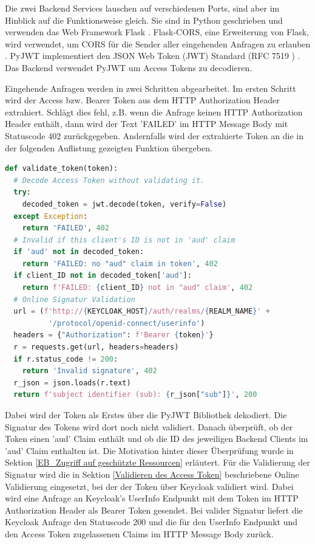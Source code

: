 Die zwei Backend Services lauschen auf verschiedenen Ports, sind aber im Hinblick auf die Funktionsweise gleich. Sie sind in Python geschrieben und verwenden das Web Framework Flask \cite{EB48}. Flask-CORS, eine Erweiterung von Flask, wird verwendet, um CORS für die Sender aller eingehenden Anfragen zu erlauben \cite{EB49}. PyJWT implementiert den JSON Web Token (JWT) Standard (RFC 7519 \cite{EB50}) \cite{EB51}. Das Backend verwendet PyJWT um Access Tokens zu decodieren.

Eingehende Anfragen werden in zwei Schritten abgearbeitet. Im ersten Schritt wird der Access bzw. Bearer Token aus dem HTTP Authorization Header extrahiert. Schlägt dies fehl, z.B. wenn die Anfrage keinen HTTP Authorization Header enthält, dann wird der Text 'FAILED' im HTTP Message Body mit Statuscode 402 zurückgegeben. Andernfalls wird der extrahierte Token an die in der folgenden Auflistung gezeigten Funktion übergeben.

\begin{lstlisting}[caption=Token Validierung im Backend, captionpos=b, language=python]
def validate_token(token):
  # Decode Access Token without validating it.
  try:
    decoded_token = jwt.decode(token, verify=False)
  except Exception:
    return 'FAILED', 402
  # Invalid if this client's ID is not in 'aud' claim
  if 'aud' not in decoded_token:
    return 'FAILED: no "aud" claim in token', 402
  if client_ID not in decoded_token['aud']:
    return f'FAILED: {client_ID} not in "aud" claim', 402
  # Online Signatur Validation
  url = (f'http://{KEYCLOAK_HOST}/auth/realms/{REALM_NAME}' +
          '/protocol/openid-connect/userinfo')
  headers = {"Authorization": f'Bearer {token}'}
  r = requests.get(url, headers=headers)
  if r.status_code != 200:
    return 'Invalid signature', 402
  r_json = json.loads(r.text)
  return f'subject identifier (sub): {r_json["sub"]}', 200
\end{lstlisting} %

Dabei wird der Token als Erstes über die PyJWT Bibliothek dekodiert. Die Signatur des Tokens wird dort noch nicht validiert. Danach überprüft, ob der Token einen 'aud' Claim enthält und ob die ID des jeweiligen Backend Clients im 'aud' Claim enthalten ist. Die Motivation hinter dieser Überprüfung wurde in Sektion \ref{EB_Zugriff auf geschützte Ressourcen} erläutert. Für die Validierung der Signatur wird die in Sektion \ref{Validieren des Access Token} beschriebene Online Validierung eingesetzt, bei der der Token über Keycloak validiert wird. Dabei wird eine Anfrage an Keycloak's UserInfo Endpunkt mit dem Token im HTTP Authorization Header als Bearer Token gesendet. Bei valider Signatur liefert die Keycloak Anfrage den Statuscode 200 und die für den UserInfo Endpunkt und den Access Token zugelassenen Claims im HTTP Message Body zurück. 

